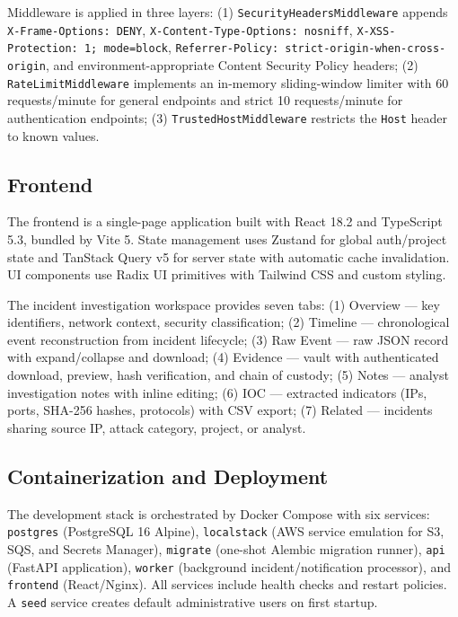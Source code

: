 \documentclass[conference]{IEEEtran}
\begin{document}
Middleware is applied in three layers: (1) \texttt{SecurityHeadersMiddleware} appends \texttt{X-Frame-Options: DENY}, \texttt{X-Content-Type-Options: nosniff}, \texttt{X-XSS-Protection: 1; mode=block}, \texttt{Referrer-Policy: strict-origin-when-cross-origin}, and environment-appropriate Content Security Policy headers; (2) \texttt{RateLimitMiddleware} implements an in-memory sliding-window limiter with 60 requests/minute for general endpoints and strict 10 requests/minute for authentication endpoints; (3) \texttt{TrustedHostMiddleware} restricts the \texttt{Host} header to known values.

\subsection{Frontend}

The frontend is a single-page application built with React 18.2 and TypeScript 5.3, bundled by Vite 5. State management uses Zustand for global auth/project state and TanStack Query v5 for server state with automatic cache invalidation. UI components use Radix UI primitives with Tailwind CSS and custom styling.

The incident investigation workspace provides seven tabs: (1) Overview — key identifiers, network context, security classification; (2) Timeline — chronological event reconstruction from incident lifecycle; (3) Raw Event — raw JSON record with expand/collapse and download; (4) Evidence — vault with authenticated download, preview, hash verification, and chain of custody; (5) Notes — analyst investigation notes with inline editing; (6) IOC — extracted indicators (IPs, ports, SHA-256 hashes, protocols) with CSV export; (7) Related — incidents sharing source IP, attack category, project, or analyst.

\subsection{Containerization and Deployment}

The development stack is orchestrated by Docker Compose with six services: \texttt{postgres} (PostgreSQL 16 Alpine), \texttt{localstack} (AWS service emulation for S3, SQS, and Secrets Manager), \texttt{migrate} (one-shot Alembic migration runner), \texttt{api} (FastAPI application), \texttt{worker} (background incident/notification processor), and \texttt{frontend} (React/Nginx). All services include health checks and restart policies. A \texttt{seed} service creates default administrative users on first startup.
\end{document}
